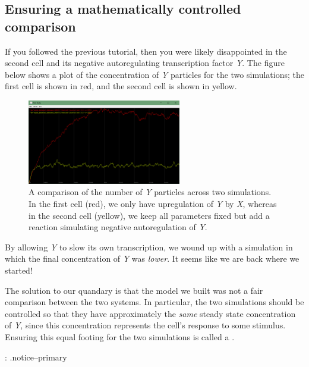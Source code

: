 \FloatBarrier
{}
\subsection{Ensuring a mathematically controlled comparison}

If you followed the previous tutorial, then you were likely disappointed in the second cell and its negative autoregulating transcription factor \textit{Y}. The figure below shows a plot of the concentration of \textit{Y} particles for the two simulations; the first cell is shown in red, and the second cell is shown in yellow.

\begin{figure}[h]
\centering
\mySfFamily
\includegraphics[width = 0.6\textwidth]{../images/nar_unequal_chart.png}
\caption{A comparison of the number of \textit{Y} particles across two simulations. In the first cell (red), we only have upregulation of \textit{Y} by \textit{X}, whereas in the second cell (yellow), we keep all parameters fixed but add a reaction simulating negative autoregulation of \textit{Y}.}
\label{fig:nar_unequal_chart}
\end{figure}

By allowing \textit{Y} to slow its own transcription, we wound up with a simulation in which the final concentration of \textit{Y} was \textit{lower}. It seems like we are back where we started!

The solution to our quandary is that the model we built was not a fair comparison between the two systems. In particular, the two simulations should be controlled so that they have approximately the \textit{same} steady state concentration of \textit{Y}, since this concentration represents the cell's response to some stimulus. Ensuring this equal footing for the two simulations is called a .

\begin{qbox}\end{qbox} 
{: .notice--primary}

